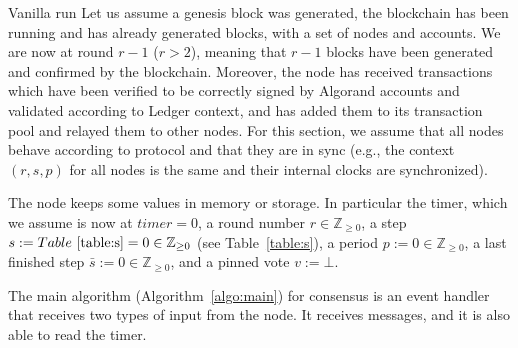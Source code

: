 \documentclass[10pt,a4paper]{article}
\begin{document}
\begin{section}{Vanilla run}\label{subsect:vanilla-run}
    Let us assume a genesis block was generated, the blockchain has been running and
    has already generated blocks, with a set of nodes and accounts. 
    We are now at round $r-1$ ($r>2$), meaning that $r-1$ blocks have been 
    generated and confirmed by the blockchain.
    Moreover, the node has received transactions which have been verified to 
    be correctly signed by Algorand accounts and validated according to Ledger context, 
    and has added them to its transaction pool and relayed them to other nodes.
    For this section, we assume that all nodes behave according to protocol
    and that they are in sync (e.g., the context $(r,s,p)$ for all nodes is 
    the same and their internal clocks are synchronized).
    
    The node keeps some values in memory or storage. In particular the 
    timer, which we assume is now at $timer=0$,
    a round number $r\in\mathbb{Z}_{\ge 0}$, 
    a step $s:=
    Table~\ref{table:s}=0\in\mathbb{Z}_{\ge 0}$ (see Table~\ref{table:s}),
    a period $p:=0\in\mathbb{Z}_{\ge 0}$, 
    a last finished step $\bar{s}:=0\in\mathbb{Z}_{\ge 0}$, and 
    a pinned vote $v:=\bot$.
    
    The main algorithm (Algorithm~\ref{algo:main}) for consensus is an event 
    handler that receives two types of input from the node. 
    It receives messages, and it is also able to read the timer.
    

\end{section}
\end{document}
